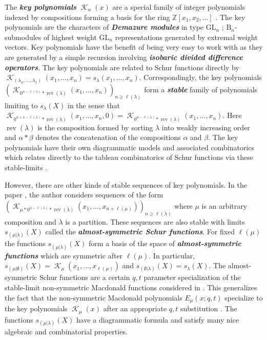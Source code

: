 \documentclass[12pt,reqno]{amsart}
\theoremstyle{definition}
\DeclareMathOperator{\rev}{rev}
\DeclareMathOperator{\cK}{\mathcal{K}}
\begin{document}
The \textbf{\textit{key polynomials}} $\cK_{\alpha}(x)$ are a special family of integer polynomials indexed by compositions forming a basis for the ring $\mathbb{Z}[x_1,x_2,\ldots]$ \cite{RS95}. The key polynomials are the characters of \textbf{\textit{Demazure modules}} in type $\mathrm{GL}_n$ \cite{Dem_1974} \cite{Andersen1985}; $\mathrm{B}_n$-submodules of highest weight $\mathrm{GL}_n$ representations generated by extremal weight vectors. Key polynomials have the benefit of being very easy to work with as they are generated by a simple recursion involving \textbf{\textit{isobaric divided difference operators}}. The key polynomials are related to Schur functions directly by $\cK_{(\lambda_{n},\ldots, \lambda_1)}(x_1,\ldots,x_n) = s_{\lambda}(x_1,\ldots,x_n)$.
Correspondingly, the key polynomials $(\cK_{0^{n-\ell(\lambda)}*\rev(\lambda)}(x_1,\ldots,x_n) )_{n \geq \ell(\lambda)}$ form a \textbf{\textit{stable}} family of polynomials limiting to $s_{\lambda}(X)$ in the sense that $\cK_{0^{n+1-\ell(\lambda)}*\rev(\lambda)}(x_1,\ldots,x_n,0) = \cK_{0^{n-\ell(\lambda)}*\rev(\lambda)}(x_1,\ldots,x_n).$ Here $\rev(\lambda)$ is the composition formed by sorting $\lambda$ into weakly increasing order and $\alpha* \beta$ denotes the concatenation of the compositions $\alpha$ and $\beta$. The key polynomials have their own diagrammatic models and associated combinatorics which relates directly to the tableau combinatorics of Schur functions via these stable-limits \cite{RS95} \cite{Kirillov_2016} \cite{mason_2009} \cite{AQ19}.

However, there are other kinds of stable sequences of key polynomials. In the paper \cite{BWAlmostSymSchur}, the author considers sequences of the form $(\cK_{\mu*0^{n-\ell(\lambda)}*\rev(\lambda)}(x_1,\ldots,x_{n+\ell(\mu)}) )_{n \geq \ell(\lambda)}$ where $\mu$ is an arbitrary composition and $\lambda$ is a partition. These sequences are also stable with limits $s_{(\mu|\lambda)}(X)$ called the \textbf{\textit{almost-symmetric Schur functions}}. For fixed $\ell(\mu)$ the functions $s_{(\mu|\lambda)}(X)$ form a basis of the space of \textbf{\textit{almost-symmetric functions}} which are symmetric after $\ell(\mu).$ In particular, $s_{(\mu|\emptyset)}(X) = \cK_{\mu}(x_1,\ldots,x_{\ell(\mu)})$ and $s_{(\emptyset|\lambda)}(X) = s_{\lambda}(X).$ The almost-symmetric Schur functions are a certain $q,t$ parameter specialization of the stable-limit non-symmetric Macdonald functions considered in \cite{BW}. This generalizes the fact that the non-symmetric Macdonald polynomials $E_{\mu}(x;q,t)$ specialize to the key polynomials $\cK_{\mu}(x)$ after an appropriate $q,t$ substitution \cite{Ion_2003}. The functions $s_{(\mu|\lambda)}(X)$ have a diagrammatic formula and satisfy many nice algebraic and combinatorial properties. 
\end{document}
